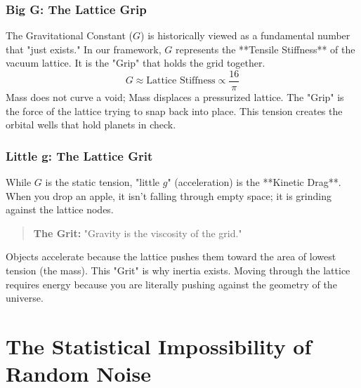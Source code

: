 \documentclass[11pt, letterpaper, openany]{book}
\begin{document}
\subsection{Big G: The Lattice Grip}
The Gravitational Constant ($G$) is historically viewed as a fundamental number that "just exists." In our framework, $G$ represents the **Tensile Stiffness** of the vacuum lattice. It is the "Grip" that holds the grid together.
\begin{equation}
    G \approx \text{Lattice Stiffness} \propto \frac{16}{\pi}
\end{equation}
Mass does not curve a void; Mass displaces a pressurized lattice. The "Grip" is the force of the lattice trying to snap back into place. This tension creates the orbital wells that hold planets in check.

\subsection{Little g: The Lattice Grit}
While $G$ is the static tension, "little $g$" (acceleration) is the **Kinetic Drag**. When you drop an apple, it isn't falling through empty space; it is grinding against the lattice nodes.
\begin{quote}
    \textbf{The Grit:} "Gravity is the viscosity of the grid."
\end{quote}
Objects accelerate because the lattice pushes them toward the area of lowest tension (the mass). This "Grit" is why inertia exists. Moving through the lattice requires energy because you are literally pushing against the geometry of the universe.


\chapter{The Statistical Impossibility of Random Noise}
\label{chap:statistical_lock}
\end{document}
